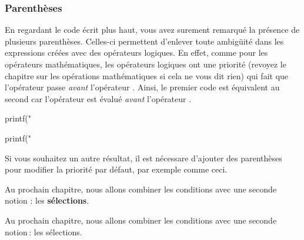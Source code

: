 \subsubsection{Parenthèses}
\label{parentheses}

En regardant le code écrit plus haut, vous avez surement remarqué la
présence de plusieurs parenthèses. Celles-ci permettent d'enlever toute
ambigüité dans les expressions créées avec des opérateurs logiques. En
effet, comme pour les opérateurs mathématiques, les opérateurs logiques
ont une priorité (revoyez le chapitre sur les opérations mathématiques
si cela ne vous dit rien) qui fait que l'opérateur \mybox{\&\&} passe
\emph{avant} l'opérateur \mybox{\textbar{}\textbar{}}. Ainsi, le
premier code est équivalent au second car l'opérateur \mybox{\&\&} est
évalué \emph{avant} l'opérateur \mybox{\textbar{}\textbar{}}.

\begin{C}
printf("%
\end{C}

\begin{C}
printf("%
\end{C}

Si vous souhaitez un autre résultat, il est nécessare d'ajouter des
parenthèses pour modifier la priorité par défaut, par exemple comme
ceci.

Au
prochain chapitre, nous allons combiner les conditions avec une seconde
notion : les \textbf{sélections}.

\hrulefill

Au prochain chapitre, nous allons combiner les conditions avec une seconde notion : les sélections.